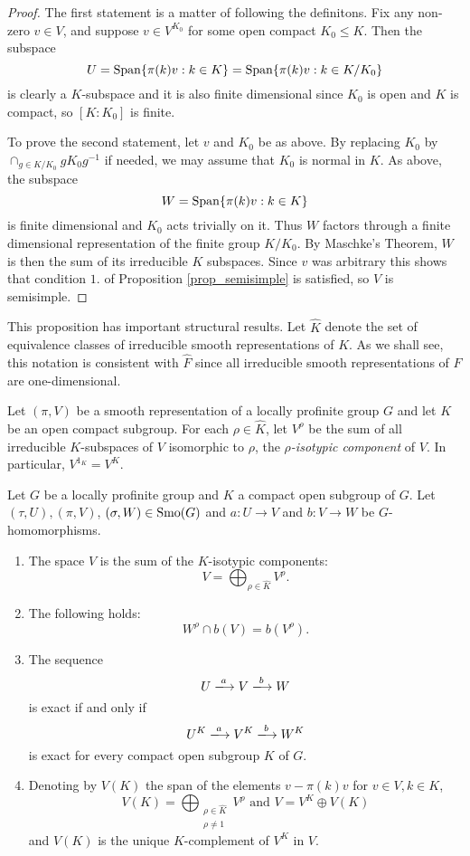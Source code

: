 \begin{proof}
    The first statement is a matter of following the definitons. Fix any non-zero $v\in V$, and suppose $v\in V^{K_0}$ for some open compact $K_0 \leq K$. Then the subspace 
    $$U=\mathrm{Span}\{\pi(k)v:k\in K\}=\mathrm{Span}\{\pi(k)v:k\in K/K_0\}$$
    is clearly a $K$-subspace and it is also finite dimensional since $K_0$ is open and $K$ is compact, so $[K:K_0]$ is finite.   

    To prove the second statement, let $v$ and $K_0$ be as above. By replacing $K_0$ by $\cap_{g\in K/K_0}gK_0g^{-1}$ if needed, we may assume that $K_0$ is normal in $K$. As above, the subspace 
    $$W=\mathrm{Span}\{\pi(k)v:k\in K\}$$
    is finite dimensional and $K_0$ acts trivially on it.
    Thus $W$ factors through a finite dimensional representation of the finite group $K/K_0$. By Maschke's Theorem, $W$ is then the sum of its irreducible $K$ subspaces. Since $v$ was arbitrary this shows that condition $1.$ of Proposition \ref{prop_semisimple} is satisfied, so $V$ is semisimple.

\end{proof}

This proposition has important structural results. Let $\hat{K}$ denote the set of equivalence classes of irreducible smooth representations of $K$. As we shall see, this notation is consistent with $\hat{F}$ since all irreducible smooth representations of $F$ are one-dimensional.

Let $(\pi,V)$ be a smooth representation of a locally profinite group $G$ and let $K$ be an open compact subgroup. For each $\rho\in\hat{K}$, let $V^\rho$ be the sum of all irreducible $K$-subspaces of $V$ isomorphic to $\rho$, the \textit{$\rho$-isotypic component} of $V$. In particular, $V^{1_K}=V^K$.

\begin{prop}
    Let $G$ be a locally profinite group and $K$ a compact open subgroup of $G$. Let $(\tau,U),(\pi,V)$, $(\sigma,W)\in\mathrm{Smo}(G)$ and $a:U\rightarrow V$ and $b:V\rightarrow W$ be $G$-homomorphisms. 
    \begin{enumerate}
        \item The space $V$ is the sum of the $K$-isotypic components:
        $$V=\bigoplus_{\rho\in\hat{K}}V^\rho.$$
        \item The following holds:
        $$W^\rho\cap b(V)=b(V^\rho).$$
        \item The sequence
        $$U\xlongrightarrow{a} V\xlongrightarrow{b} W$$
        is exact if and only if 
        $$U^K\xlongrightarrow{a} V^K \xlongrightarrow{b} W^K$$
        is exact for every compact open subgroup $K$ of $G$.
        \item Denoting by $V(K)$ the span of the elements $v-\pi(k)v$ for $v\in V, k\in K$,
        $$V(K)=\bigoplus_{\substack{\rho\in\hat{K}\\\rho\neq 1}}V^\rho \text{ and } V=V^K\oplus V(K)$$
        and $V(K)$ is the unique $K$-complement of $V^K$ in $V$. 
    \end{enumerate}
\end{prop}

